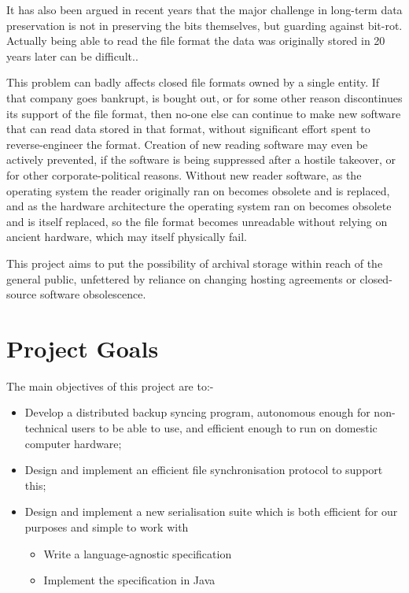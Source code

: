\documentclass[12pt,a4paper,]{adreport}
\begin{document}
It has also been argued in recent years that the major challenge in
long-term data preservation is not in preserving the bits themselves,
but guarding against bit-rot. Actually being able to read the file
format the data was originally stored in 20 years later can be
difficult.\cite{fosdem15rice}.

This problem can badly affects closed file formats owned by a single
entity. If that company goes bankrupt, is bought out, or for some other
reason discontinues its support of the file format, then no-one else can
continue to make new software that can read data stored in that format,
without significant effort spent to reverse-engineer the format.
Creation of new reading software may even be actively prevented, if the
software is being suppressed after a hostile takeover, or for other
corporate-political reasons. Without new reader software, as the
operating system the reader originally ran on becomes obsolete and is
replaced, and as the hardware architecture the operating system ran on
becomes obsolete and is itself replaced, so the file format becomes
unreadable without relying on ancient hardware, which may itself
physically fail.

This project aims to put the possibility of archival storage within
reach of the general public, unfettered by reliance on changing hosting
agreements or closed-source software obsolescence.

\section{Project Goals}\label{project-goals}

The main objectives of this project are to:-

\begin{itemize}
\itemsep1pt\parskip0pt
\item
  Develop a distributed backup syncing program, autonomous enough for
  non-technical users to be able to use, and efficient enough to run on
  domestic computer hardware;
\item
  Design and implement an efficient file synchronisation protocol to
  support this;
\item
  Design and implement a new serialisation suite which is both efficient
  for our purposes and simple to work with

  \begin{itemize}
  \itemsep1pt\parskip0pt
  \item
    Write a language-agnostic specification
  \item
    Implement the specification in Java
  \end{itemize}
\end{itemize}
\end{document}
